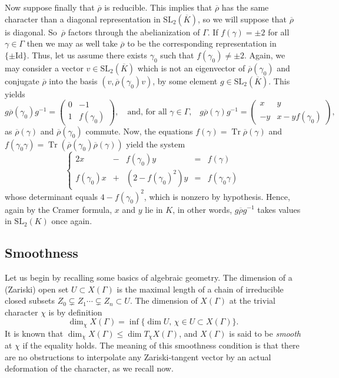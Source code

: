 \documentclass[11pt]{article}
\theoremstyle{definition}
\newcommand{\tr}{\operatorname{Tr}}
\newcommand{\SL}{\mathrm{SL}}
\newcommand{\id}{\mathrm{Id}}
\begin{document}
Now suppose finally that $\overline{\rho}$ is reducible. This implies that
$\overline{\rho}$ has the same character than a diagonal representation in
$\SL_2(\overline{K})$, so we will suppose that $\overline{\rho}$ is diagonal.
So~$\overline{\rho}$ factors through the abelianization of $\Gamma$.
If $f(\gamma)=\pm 2$ for all $\gamma\in\Gamma$ then we may as well take
$\overline{\rho}$ to be the corresponding representation in
$\lbrace\pm \id\rbrace$. Thus, let us assume there exists $\gamma_0$ such
that $f(\gamma_0)\neq \pm 2$. Again, we may consider a vector
$v\in\SL_2(\overline{K})$ which is not an eigenvector of
$\overline{\rho}(\gamma_0)$ and conjugate $\overline{\rho}$ into the basis
$(v,\overline{\rho}(\gamma_0)v)$, by some element $g\in\SL_2(\overline{K})$.
This yields
\[
g\overline{\rho}(\gamma_0)g^{-1}=
\begin{pmatrix}0 & -1 \\ 1 & f(\gamma_0)\end{pmatrix},\quad\text{
and, for all $\gamma\in\Gamma$,}\quad
g\overline{\rho}(\gamma)g^{-1}=
\begin{pmatrix}x & y \\ -y & x-yf(\gamma_0)\end{pmatrix},
\]
as $\overline{\rho}(\gamma)$ and $\overline{\rho}(\gamma_0)$ commute.
Now, the equations $f(\gamma)=\tr \overline{\rho}(\gamma)$ and
$f(\gamma_0\gamma)=\tr(\overline{\rho}(\gamma_0)\overline{\rho}(\gamma))$
yield the system
\[ \left\lbrace\begin{array}{rcrcl}2x &-& f(\gamma_0)y &=& f(\gamma) \\
f(\gamma_0)x&+&(2-f(\gamma_0)^2)y &=& f(\gamma_0\gamma)\end{array}\right. \]
whose determinant equals $4-f(\gamma_0)^2$, which is nonzero by hypothesis.
Hence, again by the Cramer formula, $x$ and $y$ lie in $K$, in other
words, $g\overline{\rho} g^{-1}$ takes values in $\SL_2(K)$ once again.

\subsection{Smoothness}

Let us begin by recalling some basics of algebraic geometry.
The dimension of a (Zariski) open set $U\subset X(\Gamma)$ is the maximal
length of a chain of irreducible closed subsets
$Z_0\subsetneq Z_1\cdots \subsetneq Z_n \subset U$.
The dimension of $X(\Gamma)$ at the trivial character $\chi$ is by definition
\[ \dim_\chi X(\Gamma)=\inf \{\dim U,\, \chi\in U \subset X(\Gamma)\}. \]
It is known that $\dim_\chi X(\Gamma)\leq \dim T_\chi X(\Gamma)$, and
$X(\Gamma)$ is said to be {\em smooth} at $\chi$ if the equality holds.
The meaning of this smoothness condition is that there are no obstructions
to interpolate any Zariski-tangent vector by an actual deformation of the
character, as we recall now.
\end{document}
